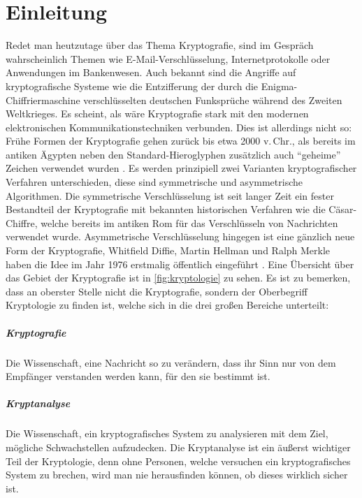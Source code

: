 \chapter{Einleitung} \label{cha:einleitung}
Redet man heutzutage über das Thema Kryptografie, sind im Gespräch wahrscheinlich
Themen wie E-Mail-Verschlüsselung, Internetprotokolle oder Anwendungen im
Bankenwesen. Auch bekannt sind die Angriffe auf kryptografische Systeme
wie die Entzifferung der durch die Enigma-Chiffriermaschine
verschlüsselten deutschen Funksprüche während des Zweiten Weltkrieges. Es scheint, als
wäre Kryptografie stark mit den modernen elektronischen Kommunikationstechniken
verbunden. Dies ist allerdings nicht so: Frühe Formen der Kryptografie
gehen zurück bis etwa 2000 v.\,Chr., als bereits im antiken Ägypten neben den
Standard-Hieroglyphen zusätzlich auch \enquote{geheime} Zeichen
verwendet wurden \parencite[2]{BOOK:crypto}. Es werden prinzipiell zwei
Varianten kryptografischer Verfahren unterschieden, diese sind
symmetrische und asymmetrische Algorithmen. Die symmetrische Verschlüsselung ist
seit langer Zeit ein fester Bestandteil der Kryptografie mit bekannten historischen
Verfahren wie die Cäsar-Chiffre, welche bereits im antiken Rom für das Verschlüsseln von
Nachrichten verwendet wurde. Asymmetrische Verschlüsselung hingegen ist eine gänzlich neue Form
der Kryptografie, Whitfield Diffie, Martin Hellman und Ralph Merkle haben die Idee im Jahr
1976 erstmalig öffentlich eingeführt \parencite[3]{BOOK:crypto}.
Eine Übersicht über das Gebiet der Kryptografie ist in \autoref{fig:kryptologie} zu sehen.
Es ist zu bemerken, dass an oberster Stelle nicht die Kryptografie, sondern
der Oberbegriff Kryptologie zu finden ist, welche sich in die drei großen Bereiche unterteilt:



\paragraph{Kryptografie}
Die Wissenschaft, eine Nachricht so zu verändern, dass ihr Sinn nur von dem Empfänger
verstanden werden kann, für den sie bestimmt ist.

\paragraph{Kryptanalyse}
Die Wissenschaft, ein kryptografisches System zu analysieren mit dem Ziel, mögliche
Schwachstellen aufzudecken. Die Kryptanalyse ist ein äußerst wichtiger Teil der
Kryptologie, denn ohne Personen, welche versuchen ein kryptografisches System zu
brechen, wird man nie herausfinden können, ob dieses wirklich sicher ist.

